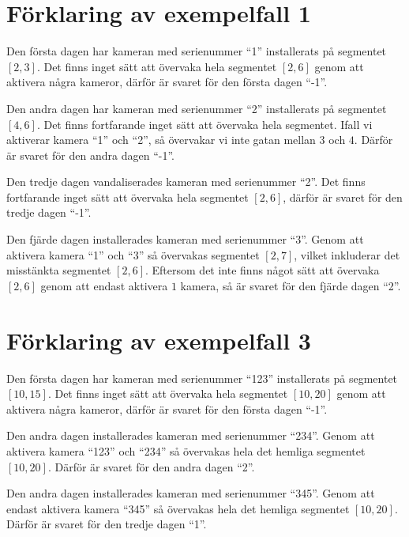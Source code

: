 \section*{Förklaring av exempelfall 1}
Den första dagen har kameran med serienummer ``1'' installerats på segmentet $[2,3]$. 
Det finns inget sätt att övervaka hela segmentet $[2,6]$ genom att aktivera några kameror, därför är svaret för den första dagen ``-1''.

Den andra dagen har kameran med serienummer ``2'' installerats på segmentet $[4,6]$.
Det finns fortfarande inget sätt att övervaka hela segmentet. Ifall vi aktiverar kamera ``1'' och ``2'', så övervakar vi inte gatan mellan $3$ och $4$. 
Därför är svaret för den andra dagen ``-1''.

Den tredje dagen vandaliserades kameran med serienummer ``2''.
Det finns fortfarande inget sätt att övervaka hela segmentet $[2,6]$, därför är svaret för den tredje dagen ``-1''.

Den fjärde dagen installerades kameran med serienummer ``3''.
Genom att aktivera kamera ``1'' och ``3'' så övervakas segmentet $[2,7]$, vilket inkluderar det misstänkta segmentet $[2,6]$.
Eftersom det inte finns något sätt att övervaka $[2,6]$ genom att endast aktivera $1$ kamera, så är svaret för den fjärde dagen ``2''.

\section*{Förklaring av exempelfall 3}
Den första dagen har kameran med serienummer ``123'' installerats på segmentet $[10,15]$. 
Det finns inget sätt att övervaka hela segmentet $[10,20]$ genom att aktivera några kameror, därför är svaret för den första dagen ``-1''.

Den andra dagen installerades kameran med serienummer ``234''.
Genom att aktivera kamera ``123'' och ``234'' så övervakas hela det hemliga segmentet $[10,20]$.
Därför är svaret för den andra dagen ``2''.

Den andra dagen installerades kameran med serienummer ``345''.
Genom att endast aktivera kamera ``345'' så övervakas hela det hemliga segmentet $[10,20]$.
Därför är svaret för den tredje dagen ``1''.
